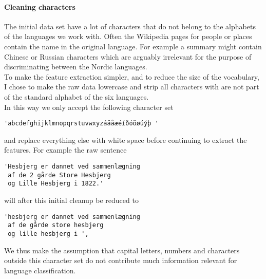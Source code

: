 \paragraph{Cleaning characters}
The initial data set have a lot of characters that do not belong to the alphabets of the languages we work with. Often the Wikipedia pages for people or places contain the name in the original language. For example a summary might contain Chinese or Russian characters which are arguably irrelevant for the purpose of discriminating between the Nordic languages.\\

To make the feature extraction simpler, and to reduce the size of the vocabulary, I chose to make the raw data lowercase and strip all characters with are not part of the standard alphabet of the six languages.\\

In this way we only accept the following character set
\begin{verbatim}
'abcdefghijklmnopqrstuvwxyzáäåæéíðóöøúýþ '
\end{verbatim}
and replace everything else with white space before continuing to extract the features.
For example the raw sentence
\begin{verbatim}
'Hesbjerg er dannet ved sammenlægning
 af de 2 gårde Store Hesbjerg
 og Lille Hesbjerg i 1822.'
\end{verbatim}
will after this initial cleanup be reduced to
\begin{verbatim}
'hesbjerg er dannet ved sammenlægning
 af de gårde store hesbjerg
 og lille hesbjerg i ',
\end{verbatim}
We thus make the assumption that capital letters, numbers and characters outside this character set do not contribute much information relevant for language classification.
